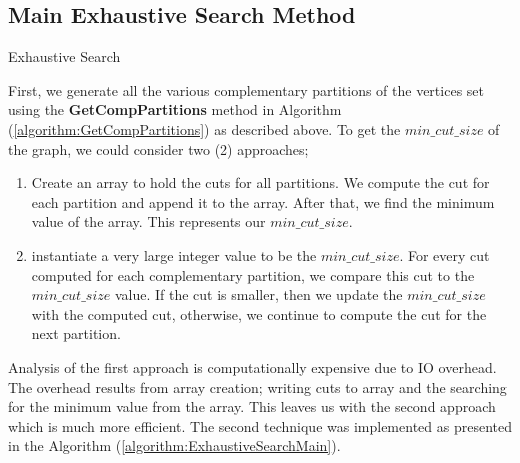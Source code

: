 \documentclass[longpaper, english, final, times]{revdetua}
\begin{document}
		\subsection{Main Exhaustive Search Method}
			\begin{algorithm}
				\caption{Exhaustive Search}
				\label{algorithm:ExhaustiveSearchMain}
				\DontPrintSemicolon
				
				
			\end{algorithm}
		
		
			First, we generate all the various complementary partitions of the vertices set using the \textbf{GetCompPartitions} method in Algorithm (\ref{algorithm:GetCompPartitions}) as described above. To get the $min\_cut\_size$ of the graph, we could consider two (2) approaches;
			\begin{enumerate}[label=(\arabic*)]
				\item Create an array to hold the cuts for all partitions. We compute the cut for each partition and append it to the array. After that, we find the minimum value of the array. This represents our $min\_cut\_size$.
				\item instantiate a very large integer value to be the $min\_cut\_size$. For every cut computed for each complementary partition, we compare this cut to the $min\_cut\_size$ value. If the cut is smaller, then we update the $min\_cut\_size$ with the computed cut, otherwise, we continue to compute the cut for the next partition.
			\end{enumerate}
			Analysis of the first approach is computationally expensive due to IO overhead. The overhead results from array creation; writing cuts to array and the searching for the minimum value from the array. This leaves us with the second approach which is much more efficient. The second technique was implemented as presented in the Algorithm (\ref{algorithm:ExhaustiveSearchMain}).\\
			
\end{document}
